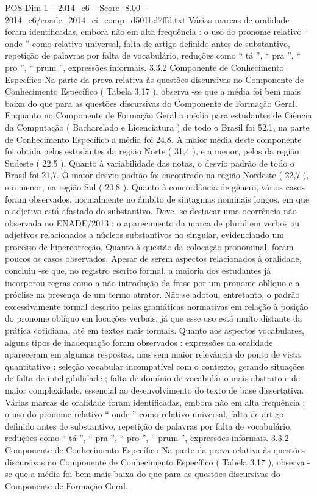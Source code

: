 \begin{textsample}{POS Dim 1 – 2014\_c6 – Score -8.00 – 2014\_c6/enade\_2014\_ci\_comp\_d501bd7ffd.txt}
Várias marcas de oralidade foram identificadas, embora não em alta frequência : o uso do pronome relativo “ onde ” como relativo universal, falta de artigo definido antes de substantivo, repetição de palavras por falta de vocabulário, reduções como “ tá ”, “ pra ”, “ pro ”, “ prum ”, expressões informais. 3.3.2 Componente de Conhecimento Específico Na parte da prova relativa às questões discursivas no Componente de Conhecimento Específico ( Tabela 3.17 ), observa -se que a média foi bem mais baixa do que para as questões discursivas do Componente de Formação Geral.
Enquanto no Componente de Formação Geral a média para estudantes de Ciência da Computação ( Bacharelado e Licenciatura ) de todo o Brasil foi 52,1, na parte de Conhecimento Específico a média foi 24,8.
A maior média deste componente foi obtida pelos estudantes da região Norte ( 31,4 ), e a menor, pelos da região Sudeste ( 22,5 ).
Quanto à variabilidade das notas, o desvio padrão de todo o Brasil foi 21,7.
O maior desvio padrão foi encontrado na região Nordeste ( 22,7 ), e o menor, na região Sul ( 20,8 ).
Quanto à concordância de gênero, vários casos foram observados, normalmente no âmbito de sintagmas nominais longos, em que o adjetivo está afastado do substantivo.
Deve -se destacar uma ocorrência não observada no ENADE/2013 : o aparecimento da marca de plural em verbos ou adjetivos relacionados a núcleos substantivos no singular, evidenciando um processo de hipercorreção.
Quanto à questão da colocação pronominal, foram poucos os casos observados.
Apesar de serem aspectos relacionados à oralidade, concluiu -se que, no registro escrito formal, a maioria dos estudantes já incorporou regras como a não introdução da frase por um pronome oblíquo e a próclise na presença de um termo atrator.
Não se adotou, entretanto, o padrão excessivamente formal descrito pelas gramáticas normativas em relação à posição do pronome oblíquo em locuções verbais, já que esse uso está muito distante da prática cotidiana, até em textos mais formais.
Quanto aos aspectos vocabulares, alguns tipos de inadequação foram observados : expressões da oralidade apareceram em algumas respostas, mas sem maior relevância do ponto de vista quantitativo ; seleção vocabular incompatível com o contexto, gerando situações de falta de inteligibilidade ; falta de domínio de vocabulário mais abstrato e de maior complexidade, essencial ao desenvolvimento do texto de base dissertativa.
Várias marcas de oralidade foram identificadas, embora não em alta frequência : o uso do pronome relativo “ onde ” como relativo universal, falta de artigo definido antes de substantivo, repetição de palavras por falta de vocabulário, reduções como “ tá ”, “ pra ”, “ pro ”, “ prum ”, expressões informais. 3.3.2 Componente de Conhecimento Específico Na parte da prova relativa às questões discursivas no Componente de Conhecimento Específico ( Tabela 3.17 ), observa -se que a média foi bem mais baixa do que para as questões discursivas do Componente de Formação Geral.

\end{textsample}
